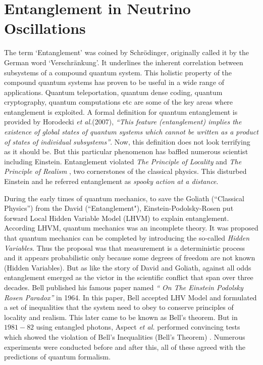 \documentclass[12pt,a4paper]{report}
\begin{document}
\chapter{Entanglement in Neutrino Oscillations}\label{sec3}
The term `Entanglement' was coined by Schr\"{o}dinger, originally called it by the German word `Verschr\"{a}nkung'. It underlines the inherent correlation between subsystems of a compound quantum system. This holistic property of the compound quantum systems has proven to be useful in a wide range of applications. Quantum teleportation, quantum dense coding, quantum cryptography, quantum computations etc are some of the key areas where entanglement is exploited.  A formal definition for quantum entanglement is provided by Horodecki \emph{et al.}(2007), \emph{“This feature (entanglement) implies the existence of global states of quantum systems which cannot be written as a product of states of individual subsystems”}. Now, this definition does not look terrifying as it should be. But this particular phenomenon has baffled numerous scientist including Einstein. Entanglement violated \emph{The Principle of Locality}  and  \emph{The Principle of Realism} \cite{Benenti}, two cornerstones of the classical physics. This disturbed Einstein and he referred entanglement as \emph{spooky action at a distance}.\par During the early times of quantum mechanics, to save the Goliath (“Classical Physics”) from the David (“Entanglement"), Einstein-Podolsky-Rosen put forward Local Hidden Variable Model (LHVM) \cite{epr} to explain entanglement. According LHVM, quantum mechanics was an incomplete theory. It was proposed that quantum mechanics can be completed by introducing the so-called \emph{Hidden Variables}. Thus the proposal was that measurement is a deterministic process and it appears probabilistic only because some degrees of freedom are not known (Hidden Variables).
But as like the story of David and Goliath, against all odds entanglement emerged as the victor in the scientific conflict that span over three decades. Bell published his famous paper named \emph{“ On The Einstein Podolsky Rosen Paradox”} \cite{bell} in 1964. In this paper, Bell accepted LHV Model and formulated a set of inequalities that the system need to obey to conserve principles of locality and realism. This later came to be known as Bell’s theorem. But in $1981-82$ using entangled photons, Aspect \emph{et al.} performed convincing tests which showed the violation of Bell’s Inequalities (Bell’s Theorem) \cite{aspect82a}\cite{aspect82b}. Numerous experiments were conducted before and after this, all of these agreed with the predictions of quantum formalism.
\end{document}
